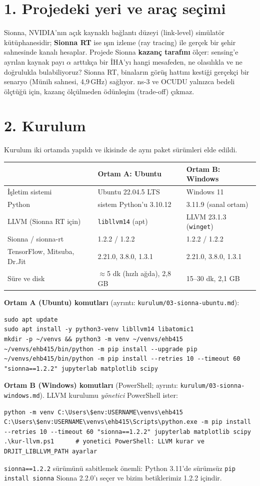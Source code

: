 \documentclass[10.5pt,a4paper]{article}
\begin{document}

\section*{1. Projedeki yeri ve araç seçimi}
Sionna, NVIDIA'nın açık kaynaklı bağlantı düzeyi (link-level) simülatör kütüphanesidir; \textbf{Sionna RT} ise ışın izleme (ray tracing) ile gerçek bir şehir sahnesinde kanalı hesaplar. Projede Sionna \textbf{kazanç tarafını} ölçer: sensing'e ayrılan kaynak payı $\alpha$ arttıkça bir İHA'yı hangi mesafeden, ne olasılıkla ve ne doğrulukla bulabiliyoruz? Sionna RT, binaların görüş hattını kestiği gerçekçi bir senaryo (Münih sahnesi, 4,9\,GHz) sağlıyor. ns-3 ve OCUDU yalnızca bedeli ölçtüğü için, kazanç ölçülmeden ödünleşim (trade-off) çıkmaz.

\section*{2. Kurulum}
Kurulum iki ortamda yapıldı ve ikisinde de aynı paket sürümleri elde edildi.
\begin{center}\sffamily\small
\begin{tabular}{@{}lll@{}}
\toprule
 & \textbf{Ortam A: Ubuntu} & \textbf{Ortam B: Windows} \\
\midrule
İşletim sistemi & Ubuntu 22.04.5 LTS & Windows 11 \\
Python & sistem Python'u 3.10.12 & 3.11.9 (sanal ortam) \\
LLVM (Sionna RT için) & \texttt{libllvm14} (apt) & LLVM 23.1.3 (\texttt{winget}) \\
Sionna / sionna-rt & 1.2.2 / 1.2.2 & 1.2.2 / 1.2.2 \\
TensorFlow, Mitsuba, Dr.Jit & 2.21.0, 3.8.0, 1.3.1 & 2.21.0, 3.8.0, 1.3.1 \\
Süre ve disk & $\approx$5 dk (hızlı ağda), 2,8 GB & 15--30 dk, 2,1 GB \\
\bottomrule
\end{tabular}
\end{center}
\textbf{Ortam A (Ubuntu) komutları} (ayrıntı: \texttt{kurulum/03-sionna-ubuntu.md}):
\begin{lstlisting}
sudo apt update
sudo apt install -y python3-venv libllvm14 libatomic1
mkdir -p ~/venvs && python3 -m venv ~/venvs/ehb415
~/venvs/ehb415/bin/python -m pip install --upgrade pip
~/venvs/ehb415/bin/python -m pip install --retries 10 --timeout 60 "sionna==1.2.2" jupyterlab matplotlib scipy
\end{lstlisting}
\textbf{Ortam B (Windows) komutları} (PowerShell; ayrıntı: \texttt{kurulum/03-sionna-windows.md}). LLVM kurulumu \emph{yönetici} PowerShell ister:
\begin{lstlisting}
python -m venv C:\Users\$env:USERNAME\venvs\ehb415
C:\Users\$env:USERNAME\venvs\ehb415\Scripts\python.exe -m pip install --retries 10 --timeout 60 "sionna==1.2.2" jupyterlab matplotlib scipy
.\kur-llvm.ps1      # yonetici PowerShell: LLVM kurar ve DRJIT_LIBLLVM_PATH ayarlar
\end{lstlisting}
\texttt{sionna==1.2.2} sürümünü sabitlemek önemli: Python 3.11'de sürümsüz \texttt{pip install sionna} Sionna 2.2.0'ı seçer ve bizim betiklerimiz 1.2.2 içindir.
\end{document}
